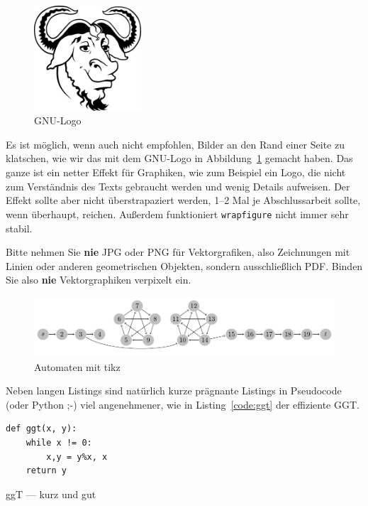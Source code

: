 \documentclass[11pt,a4paper]{report}
\begin{document}
\begin{figure}
  \centering
  \includegraphics[width=4cm]{gnu}
  \caption{GNU-Logo~\cite{gnulogo,fal}}
  \label{fig:gnu}
\end{figure}
Es ist möglich, wenn auch nicht empfohlen, 
Bilder an den 
Rand einer Seite zu klatschen, wie wir das mit dem 
GNU-Logo in Abbildung~\ref{fig:gnu} gemacht haben. 
Das ganze ist ein netter Effekt für Graphiken, wie zum Beispiel ein
Logo, die nicht zum Verständnis des Texts gebraucht werden und wenig
Details aufweisen. 
Der Effekt sollte aber nicht überstrapaziert werden, 1--2 Mal 
je Abschlussarbeit sollte, wenn überhaupt, rei\-chen.
Außerdem funktioniert \verb|wrapfigure| nicht immer sehr stabil.



Bitte nehmen Sie \textbf{nie} JPG oder PNG für Vektorgrafiken, 
also Zeichnungen mit Linien oder anderen geometrischen Objekten,
sondern ausschließlich PDF.
Binden Sie also \textbf{nie} Vektorgraphiken verpixelt ein.


\begin{figure}[htb]
\centering
\includegraphics[width=.9\textwidth]{automata.pdf}
\caption{Automaten mit tikz~\cite{tikzautomata}}
\label{fig:tikz}
\end{figure}


Neben langen Listings sind natürlich kurze prägnante
Listings in Pseudocode (oder Python ;-) viel 
angenehmener, wie in Listing~\ref{code:ggt} der
effiziente GGT.

\begin{listing}[htbp]
\begin{lstlisting}
def ggt(x, y):
    while x != 0:
        x,y = y%x, x
    return y
\end{lstlisting}
\caption{ggT --- kurz und gut}
\label{code:ggt}
\end{listing}
\end{document}
